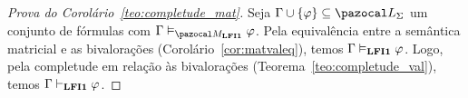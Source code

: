         \begin{proof}[Prova do Corolário~\ref{teo:completude_mat}]
            Seja $\Gamma \cup \{\phi\} \subseteq \ling{}$ um conjunto de fórmulas com $\Gamma \conmat \phi$. Pela equivalência entre a semântica matricial e as bivalorações (Corolário~\ref{cor:matvaleq}), temos $\Gamma \vDash_{{\normalfont\textbf{LFI1}}{}} \varphi$. Logo, pela completude em relação às bivalorações (Teorema~\ref{teo:completude_val}), temos $\Gamma \vdash_{{\normalfont\textbf{LFI1}}{}} \varphi$.
        \end{proof}
